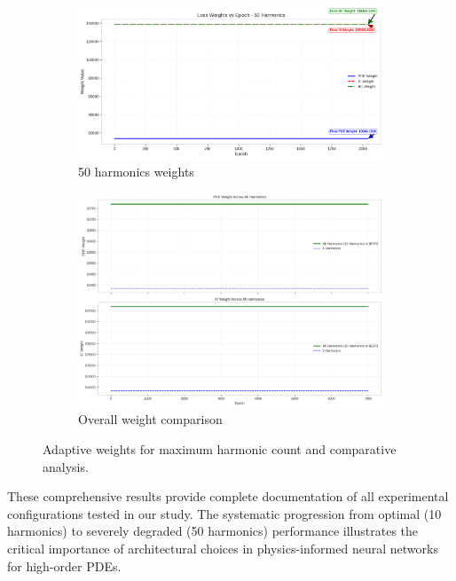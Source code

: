 \begin{figure}[H]
    \centering
    \begin{subfigure}[b]{0.48\textwidth}
        \centering
        \includegraphics[width=\textwidth]{figures/weight_factors_50h.png}
        \caption{50 harmonics weights}
    \end{subfigure}
    \hfill
    \begin{subfigure}[b]{0.48\textwidth}
        \centering
        \includegraphics[width=\textwidth]{figures/weight_factors.png}
        \caption{Overall weight comparison}
    \end{subfigure}
    \caption{Adaptive weights for maximum harmonic count and comparative analysis.}
    \label{fig:weights_50h_overview}
\end{figure}

These comprehensive results provide complete documentation of all experimental configurations tested in our study. The systematic progression from optimal (10 harmonics) to severely degraded (50 harmonics) performance illustrates the critical importance of architectural choices in physics-informed neural networks for high-order PDEs.

